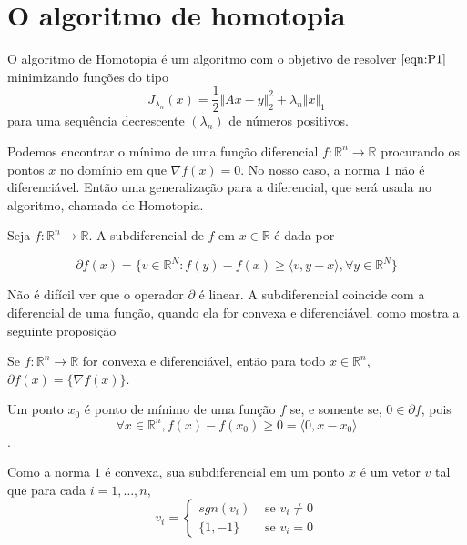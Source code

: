 \chapter{O algoritmo de homotopia}

O algoritmo de Homotopia \cite{dontsa} é um algoritmo com o objetivo de resolver $\eqref{eqn:P1}$ minimizando funções do tipo
$$J_{\lambda_n}(x) = \frac{1}{2} \Vert Ax - y \Vert_2^2 + \lambda_n \Vert x \Vert_1$$
para uma sequência decrescente $(\lambda_n)$ de números positivos.

Podemos encontrar o mínimo de uma função diferencial $f: \mathbb{R}^n \longrightarrow \mathbb{R}$ procurando os pontos $x$ no domínio em que $\nabla f(x) = 0$. No nosso caso, a norma $1$ não é diferenciável. Então  uma generalização para a diferencial, que será usada no algoritmo, chamada de Homotopia.

\begin{definicao}
Seja $f: \mathbb{R}^n \longrightarrow \mathbb{R}$. A subdiferencial de $f$ em $x \in \mathbb{R}$ é dada por

$$\partial f(x) = \{ v \in \mathbb{R}^N : f(y) - f(x) \geq \langle v, y - x \rangle, \forall y \in \mathbb{R}^N \}$$

\end{definicao}

Não é difícil ver que o operador $\partial$ é linear. A subdiferencial coincide com a diferencial de uma função, quando ela for convexa e diferenciável, como mostra a seguinte proposição 

\begin{proposicao}
Se $f: \mathbb{R}^n \longrightarrow \mathbb{R}$ for convexa e diferenciável, então para todo $x \in \mathbb{R}^n$, $\partial f(x) = \{ \nabla f(x) \}$.
\end{proposicao}

Um ponto $x_0$ é ponto de mínimo de uma função $f$ se, e somente se, $0 \in \partial f$, pois
$$ \forall x \in \mathbb{R}^n, f(x) - f(x_0) \geq 0 = \langle 0, x - x_0 \rangle$$.

Como a norma $1$ é convexa, sua subdiferencial em um ponto $x$ é um vetor $v$ tal que para cada $i = 1, \hdots, n$,
$$ v_i =
\begin{cases}
	sgn(v_i) & \mbox{ se } v_i \neq 0 \\
	\lbrace 1, -1\rbrace & \mbox{ se } v_i = 0
\end{cases}$$

